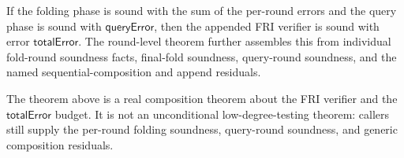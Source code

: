 \begin{theorem}\label{thm:fri_soundness_total_error}
    If the folding phase is sound with the sum of the per-round errors and the query phase is
    sound with $\mathsf{queryError}$, then the appended FRI verifier is sound with error
    $\mathsf{totalError}$.  The round-level theorem further assembles this from individual
    fold-round soundness facts, final-fold soundness, query-round soundness, and the named
    sequential-composition and append residuals.
\end{theorem}

\begin{remark}\label{rem:fri_soundness_status}
    The theorem above is a real composition theorem about the FRI verifier and the
    $\mathsf{totalError}$ budget.  It is not an unconditional low-degree-testing theorem:
    callers still supply the per-round folding soundness, query-round soundness, and generic
    composition residuals.
\end{remark}


